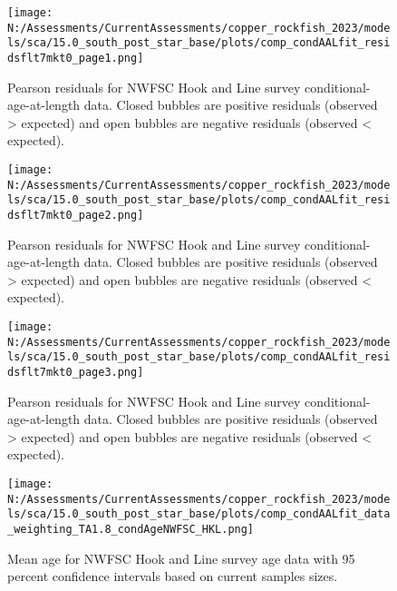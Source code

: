 \documentclass[11pt,
  english,
  letterpaper,
]{article}
\begin{document}
\begin{figure}
\centering
\texttt{[image: N:/Assessments/CurrentAssessments/copper\_rockfish\_2023/models/sca/15.0\_south\_post\_star\_base/plots/comp\_condAALfit\_residsflt7mkt0\_page1.png]}
\caption{Pearson residuals for NWFSC Hook and Line survey conditional-age-at-length data. Closed bubbles are positive residuals (observed \textgreater{} expected) and open bubbles are negative residuals (observed \textless{} expected).\label{fig:nwfsc-hkl-age-pearson-1}}
\end{figure}

\pagebreak

\begin{figure}
\centering
\texttt{[image: N:/Assessments/CurrentAssessments/copper\_rockfish\_2023/models/sca/15.0\_south\_post\_star\_base/plots/comp\_condAALfit\_residsflt7mkt0\_page2.png]}
\caption{Pearson residuals for NWFSC Hook and Line survey conditional-age-at-length data. Closed bubbles are positive residuals (observed \textgreater{} expected) and open bubbles are negative residuals (observed \textless{} expected).\label{fig:nwfsc-hkl-age-pearson-2}}
\end{figure}

\pagebreak

\begin{figure}
\centering
\texttt{[image: N:/Assessments/CurrentAssessments/copper\_rockfish\_2023/models/sca/15.0\_south\_post\_star\_base/plots/comp\_condAALfit\_residsflt7mkt0\_page3.png]}
\caption{Pearson residuals for NWFSC Hook and Line survey conditional-age-at-length data. Closed bubbles are positive residuals (observed \textgreater{} expected) and open bubbles are negative residuals (observed \textless{} expected).\label{fig:nwfsc-hkl-age-pearson-3}}
\end{figure}

\pagebreak

\begin{figure}
\centering
\texttt{[image: N:/Assessments/CurrentAssessments/copper\_rockfish\_2023/models/sca/15.0\_south\_post\_star\_base/plots/comp\_condAALfit\_data\_weighting\_TA1.8\_condAgeNWFSC\_HKL.png]}
\caption{Mean age for NWFSC Hook and Line survey age data with 95 percent confidence intervals based on current samples sizes.\label{fig:nwfsc-hkl-mean-age-fit}}
\end{figure}

\pagebreak
\end{document}
